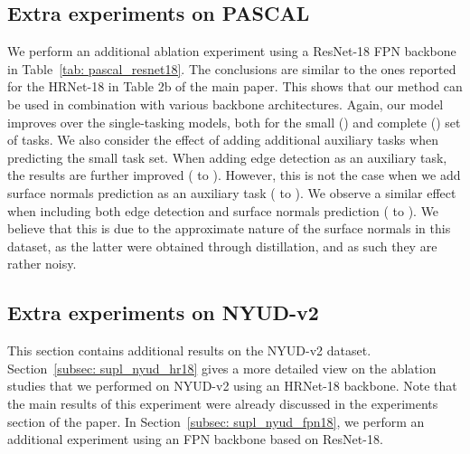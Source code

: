 \documentclass[runningheads]{llncs}
\begin{document}
\subsection{Extra experiments on PASCAL}
We perform an additional ablation experiment using a ResNet-18 FPN backbone in Table~\ref{tab: pascal_resnet18}. The conclusions are similar to the ones reported for the HRNet-18 in Table 2b of the main paper. This shows that our method can be used in combination with various backbone architectures. Again, our model improves over the single-tasking models, both for the small () and complete () set of tasks. We also consider the effect of adding additional auxiliary tasks when predicting the small task set. When adding edge detection as an auxiliary task, the results are further improved ( to ). However, this is not the case when we add surface normals prediction as an auxiliary task ( to ). We observe a similar effect when including both edge detection and surface normals prediction ( to ). We believe that this is due to the approximate nature of the surface normals in this dataset, as the latter were obtained through distillation, and as such they are rather noisy. 

\subsection{Extra experiments on NYUD-v2}
This section contains additional results on the NYUD-v2 dataset. Section~\ref{subsec: supl_nyud_hr18} gives a more detailed view on the ablation studies that we performed on NYUD-v2 using an HRNet-18 backbone. Note that the main results of this experiment were already discussed in the experiments section of the paper. In Section~\ref{subsec: supl_nyud_fpn18}, we perform an additional experiment using an FPN backbone based on ResNet-18. 
\end{document}
